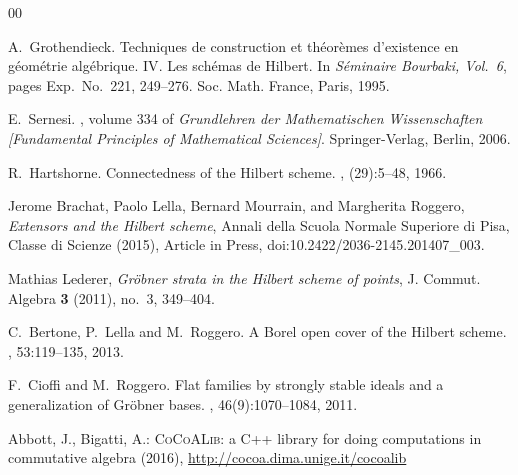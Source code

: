 \documentclass[11pt]{article}
\begin{document}


\begin{thebibliography}{00}
\setlength{\itemsep}{-1mm}
\footnotesize
{}
A.~Grothendieck.
\newblock Techniques de construction et th{\'e}or{\`e}mes d'existence en
  g{\'e}om{\'e}trie alg{\'e}brique. {IV}. {L}es sch{\'e}mas de {H}ilbert.
\newblock In {\em S{\'e}minaire {B}ourbaki, {V}ol.\ 6}, pages Exp.\ No.\ 221,
  249--276. Soc. Math. France, Paris, 1995.

E.~Sernesi.
, volume 334 of {\em
  Grundlehren der Mathematischen Wissenschaften [Fundamental Principles of
  Mathematical Sciences]}.
\newblock Springer-Verlag, Berlin, 2006.

R.~Hartshorne.
\newblock Connectedness of the {H}ilbert scheme.
, (29):5--48, 1966.

Jerome Brachat, Paolo Lella, Bernard Mourrain, and Margherita Roggero,
  \emph{Extensors and the {H}ilbert scheme}, Annali della Scuola Normale
  Superiore di Pisa, Classe di Scienze (2015), Article in Press,
  doi:10.2422/2036-2145.201407\_003.

Mathias Lederer, \emph{Gr{\"o}bner strata in the {H}ilbert scheme of points},
  J. Commut. Algebra \textbf{3} (2011), no.~3, 349--404.


C.~Bertone, P.~Lella and M.~Roggero.
\newblock A {B}orel open cover of the {H}ilbert scheme.
, 53:119--135, 2013.

F.~Cioffi and M.~Roggero.
\newblock Flat families by strongly stable ideals and a generalization of
  {G}r{\"o}bner bases.
, 46(9):1070--1084, 2011.

Abbott, J., Bigatti, A.: \textsc{CoCoALib}: a {C++} library for doing
  computations in commutative algebra (2016),
  \url{http://cocoa.dima.unige.it/cocoalib}
\end{thebibliography}
\normalsize
\end{document}
